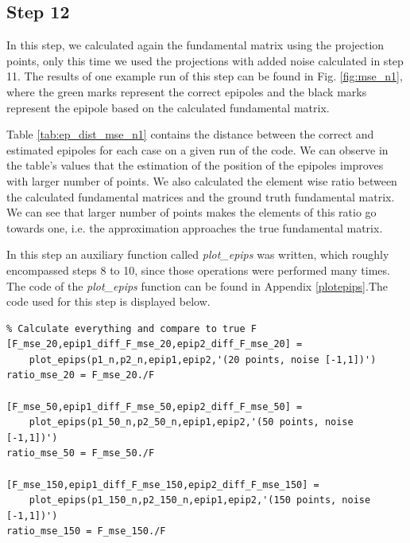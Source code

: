 \documentclass[peerreview,11pt]{IEEEtran}
\begin{document}
\subsection{Step 12}

In this step, we calculated again the fundamental matrix using the projection points, only this time we used the projections with added noise calculated in step 11. The results of one example run of this step can be found in Fig. \ref{fig:mse_n1}, where the green marks represent the correct epipoles and the black marks represent the epipole based on the calculated fundamental matrix. 

Table \ref{tab:ep_dist_mse_n1} contains the distance between the correct and estimated epipoles for each case on a given run of the code. We can observe in the table's values that the estimation of the position of the epipoles improves with larger number of points. We also calculated the element wise ratio between the calculated fundamental matrices and the ground truth fundamental matrix. We can see that  larger number of points makes the elements of this ratio go towards one, i.e. the approximation approaches the true fundamental matrix.

In this step an auxiliary function called \textit{plot\_epips} was written, which roughly encompassed steps 8 to 10, since those operations were performed many times. The code of the \textit{plot\_epips} function can be found in Appendix \ref{plotepips}.The code used for this step is displayed below.

\begin{verbatim}
% Calculate everything and compare to true F
[F_mse_20,epip1_diff_F_mse_20,epip2_diff_F_mse_20] = 
    plot_epips(p1_n,p2_n,epip1,epip2,'(20 points, noise [-1,1])')
ratio_mse_20 = F_mse_20./F

[F_mse_50,epip1_diff_F_mse_50,epip2_diff_F_mse_50] =
    plot_epips(p1_50_n,p2_50_n,epip1,epip2,'(50 points, noise [-1,1])')
ratio_mse_50 = F_mse_50./F

[F_mse_150,epip1_diff_F_mse_150,epip2_diff_F_mse_150] =
    plot_epips(p1_150_n,p2_150_n,epip1,epip2,'(150 points, noise [-1,1])')
ratio_mse_150 = F_mse_150./F
\end{verbatim}
\end{document}
